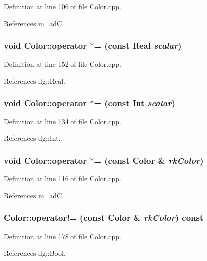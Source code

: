 Definition at line 106 of file Color.cpp.

References m\_\-ad\-C.
\subsubsection{\setlength{\rightskip}{0pt plus 5cm}void Color::operator $\ast$= (const {\bf Real} {\em scalar})}\label{classdg_1_1Color_a40}




Definition at line 152 of file Color.cpp.

References dg::Real.
\subsubsection{\setlength{\rightskip}{0pt plus 5cm}void Color::operator $\ast$= (const {\bf Int} {\em scalar})}\label{classdg_1_1Color_a38}




Definition at line 134 of file Color.cpp.

References dg::Int.
\subsubsection{\setlength{\rightskip}{0pt plus 5cm}void Color::operator $\ast$= (const Color \& {\em rk\-Color})}\label{classdg_1_1Color_a36}




Definition at line 116 of file Color.cpp.

References m\_\-ad\-C.
\subsubsection{ Color::operator!= (const Color \& {\em rk\-Color}) const}\label{classdg_1_1Color_a27}




Definition at line 178 of file Color.cpp.

References dg::Bool.
